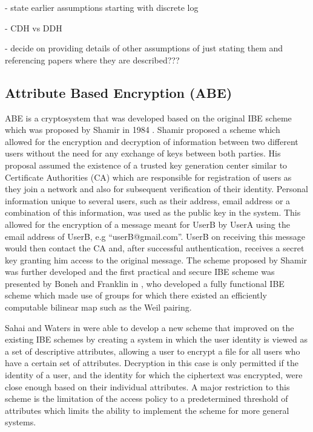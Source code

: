 - state earlier assumptions starting with discrete log

- CDH vs DDH

- decide on providing details of other assumptions of just stating them and referencing papers where they are described???

\subsection{Attribute Based Encryption (ABE)}

ABE is a cryptosystem that was developed based on the original IBE scheme which was proposed by Shamir in 1984 \cite{Shamir1985}. Shamir proposed a scheme which allowed for the encryption and decryption of information between two different users without the need for any exchange of keys between both parties. His proposal assumed the existence of a trusted key generation center similar to Certificate Authorities (CA) which are responsible for registration of users as they join a network and also for subsequent verification of their identity. Personal information unique to several users, such as their address, email address or a combination of this information, was used as the public key in the system. This allowed for the encryption of a message meant for UserB by UserA using the email address of UserB, e.g “userB@gmail.com”. UserB on receiving this message would then contact the CA and, after successful authentication, receives a secret key granting him access to the original message. The scheme proposed by Shamir was further developed and the first practical and secure IBE scheme was presented by Boneh and Franklin in \cite{Boneh2003}, who developed a fully functional IBE scheme which made use of groups for which there existed an efficiently computable bilinear map such as the Weil pairing.

Sahai and Waters in \cite{Sahai2005} were able to develop a new scheme that improved on the existing IBE schemes by creating a system in which the user identity is viewed as a set of descriptive attributes, allowing a user to encrypt a file for all users who have a certain set of attributes. Decryption in this case is only permitted if the identity of a user, and the identity for which the ciphertext was encrypted, were close enough based on their individual attributes. A major restriction to this scheme is the limitation of the access policy to a predetermined threshold of attributes which limits the ability to implement the scheme for more general systems.

